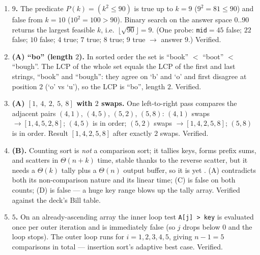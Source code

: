 \documentclass[11pt]{article}
\begin{document}
\begin{enumerate}
\item[\textbf{Q6}] \textbf{$9$.} The predicate $P(k) = (k^2 \le 90)$ is true up to $k = 9$ ($9^2 = 81 \le 90$) and false from $k = 10$ ($10^2 = 100 > 90$). Binary search on the answer space $0..90$ returns the largest feasible $k$, i.e.\ $\lfloor\sqrt{90}\rfloor = 9$. (One probe: \texttt{mid}$=45$ false; $22$ false; $10$ false; $4$ true; $7$ true; $8$ true; $9$ true $\to$ answer $9$.) Verified.

\item[\textbf{Q7}] \textbf{(A) ``bo'' (length $2$).} In sorted order the set is ``book'' $<$ ``boot'' $<$ ``bough''. The LCP of the whole set equals the LCP of the first and last strings, ``book'' and ``bough'': they agree on `b' and `o' and first disagree at position $2$ (`o' vs `u'), so the LCP is ``bo'', length $2$. Verified.

\item[\textbf{Q8}] \textbf{(A) $[1,\ 4,\ 2,\ 5,\ 8]$ with $2$ swaps.} One left-to-right pass compares the adjacent pairs $(4,1)$, $(4,5)$, $(5,2)$, $(5,8)$: $(4,1)$ swaps $\to [1,4,5,2,8]$; $(4,5)$ is in order; $(5,2)$ swaps $\to [1,4,2,5,8]$; $(5,8)$ is in order. Result $[1,4,2,5,8]$ after exactly $2$ swaps. Verified.

\item[\textbf{Q9}] \textbf{(B).} Counting sort is \emph{not} a comparison sort; it tallies keys, forms prefix sums, and scatters in $\Theta(n+k)$ time, stable thanks to the reverse scatter, but it needs a $\Theta(k)$ tally plus a $\Theta(n)$ output buffer, so it is  yet . (A) contradicts both its non-comparison nature and its linear time; (C) is false on both counts; (D) is false --- a huge key range blows up the tally array. Verified against the deck's Bill table.

\item[\textbf{Q10}] \textbf{$5$.} On an already-ascending array the inner loop test \texttt{A[j] > key} is evaluated once per outer iteration and is immediately false (so $j$ drops below $0$ and the loop stops). The outer loop runs for $i = 1,2,3,4,5$, giving $n-1 = 5$ comparisons in total --- insertion sort's adaptive best case. Verified.
\end{enumerate}
\end{document}
